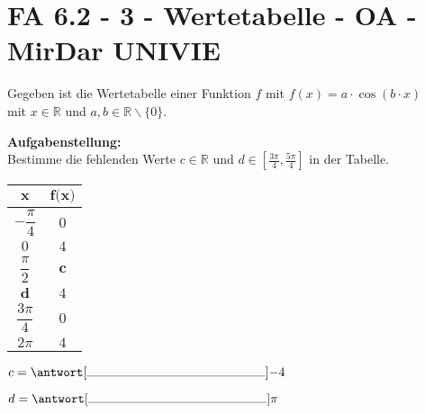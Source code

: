 \section{FA 6.2 - 3 - Wertetabelle - OA - MirDar UNIVIE}

\begin{beispiel}[FA 6.2]{1}
Gegeben ist die Wertetabelle einer Funktion $f$ mit  $f(x)= a\cdot \cos(b\cdot x)$ \\ 
mit $x \in \mathbb{R}$ und $a,b \in \mathbb{R} \backslash \{ 0 \}$.

\textbf{Aufgabenstellung:}\\
Bestimme die fehlenden Werte $c \in \mathbb{R}$ und $d \in \left[ \displaystyle \frac{3 \pi}{4} , \frac{5 \pi}{4} \right]$ in der Tabelle. 

\begin{center}
\renewcommand{\arraystretch}{2}
\begin{tabular}{|c|c|} \hline
$\textbf{x}$ & $\textbf{f(x)}$ \\ \hline
$-\dfrac{\pi}{4}$ & $0$ \\ \hline
$0$ & $4$ \\ \hline
$\dfrac{\pi}{2}$ & $\textbf{c}$ \\ \hline
$\textbf{d}$ & $4$ \\ \hline
$\dfrac{3\pi}{4}$ & $0$ \\ \hline
$2\pi$ & $4$ \\ \hline
\end{tabular}
\end{center}


$c=\antwort[\rule{5cm}{0.3pt}]{-4}$\leer

$d=\antwort[\rule{5cm}{0.3pt}]{\pi}$
\end{beispiel}